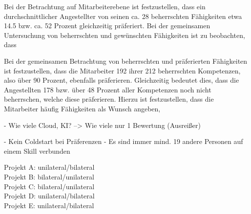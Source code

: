 Bei der Betrachtung auf Mitarbeiterebene ist festzustellen, dass ein durchschnittlicher Angestellter von seinen ca. 28 beherrschten Fähigkeiten etwa 14.5 bzw. ca. 52 Prozent gleichzeitig präferiert. Bei der gemeinsamen Untersuchung von beherrschten und gewünschten Fähigkeiten ist zu beobachten, dass 

Bei der gemeinsamen Betrachtung von beherrschten und präferierten Fähigkeiten ist festzustellen, dass die Mitarbeiter 192 ihrer 212 beherrschten Kompetenzen, also über 90 Prozent, ebenfalls präferieren. Gleichzeitig bedeutet dies, dass die Angestellten 178 bzw. über 48 Prozent aller Kompetenzen noch nicht beherrschen, welche diese präferieren. Hierzu ist festzustellen, dass die Mitarbeiter häufig Fähigkeiten als Wunsch angeben, 

- Wie viele Cloud, KI? --> Wie viele nur 1 Bewertung (Ausreißer)

\newpage
- Kein Coldstart bei Präferenzen
- Es sind immer mind. 19 andere Personen auf einem Skill verbunden

Projekt A: unilateral/bilateral\\
Projekt B: bilateral/unilateral\\
Projekt C: bilateral/unilateral\\
Projekt D: unilateral/bilateral\\
Projekt E: unilateral/bilateral

